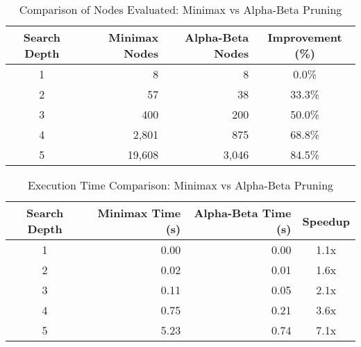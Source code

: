 
\begin{table}[htbp]
\centering
\caption{Comparison of Nodes Evaluated: Minimax vs Alpha-Beta Pruning}
\label{tab:nodes_comparison}
\begin{tabular}{|c|r|r|c|}
\hline
\textbf{Search Depth} & \textbf{Minimax Nodes} & \textbf{Alpha-Beta Nodes} & \textbf{Improvement (\%)} \\
\hline
1 & 8 & 8 & 0.0\% \\
2 & 57 & 38 & 33.3\% \\
3 & 400 & 200 & 50.0\% \\
4 & 2,801 & 875 & 68.8\% \\
5 & 19,608 & 3,046 & 84.5\% \\
\hline
\end{tabular}
\end{table}

\begin{table}[htbp]
\centering
\caption{Execution Time Comparison: Minimax vs Alpha-Beta Pruning}
\label{tab:time_comparison}
\begin{tabular}{|c|r|r|c|}
\hline
\textbf{Search Depth} & \textbf{Minimax Time (s)} & \textbf{Alpha-Beta Time (s)} & \textbf{Speedup} \\
\hline
1 & 0.00 & 0.00 & 1.1x \\
2 & 0.02 & 0.01 & 1.6x \\
3 & 0.11 & 0.05 & 2.1x \\
4 & 0.75 & 0.21 & 3.6x \\
5 & 5.23 & 0.74 & 7.1x \\
\hline
\end{tabular}
\end{table}
